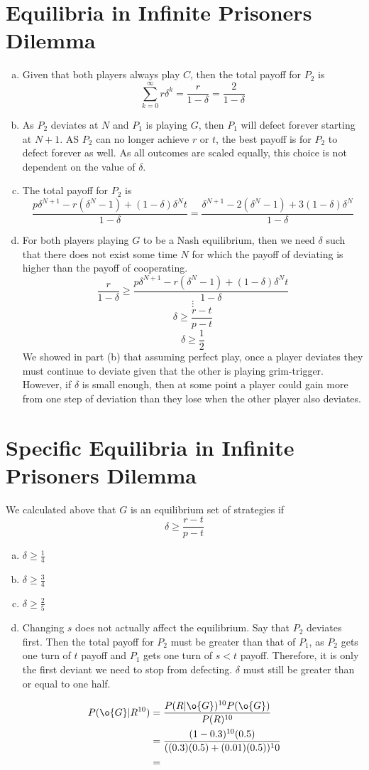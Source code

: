 \documentclass[12pt]{article}
\begin{document}
\section{Equilibria in Infinite Prisoners Dilemma}
\begin{enumerate}[(a)]
\item Given that both players always play $C$, then the total payoff for $P_2$ is
\[\sum_{k = 0}^{\infty} r \delta^k = \frac{r}{1 - \delta} = \frac{2}{1 - \delta}\]
\item As $P_2$ deviates at $N$ and $P_1$ is playing $G$, then $P_1$ will defect forever starting at $N + 1$. AS $P_2$ can no longer achieve $r$ or $t$, the best payoff is for $P_2$ to defect forever as well. As all outcomes are scaled equally, this choice is not dependent on the value of $\delta$.
\item The total payoff for $P_2$ is 
\[\frac{p \delta^{N + 1} -r (\delta^N - 1) + (1-\delta)\delta^N t}{1 - \delta} = \frac{\delta^{N + 1} -2 (\delta^N - 1) + 3(1-\delta)\delta^N}{1 - \delta}\]
\item For both players playing $G$ to be a Nash equilibrium, then we need $\delta$ such that there does not exist some time $N$ for which the payoff of deviating is higher than the payoff of cooperating.
\[\frac{r}{1 - \delta} \geq \frac{p \delta^{N + 1} -r (\delta^N - 1) + (1-\delta)\delta^N t}{1 - \delta}\]
\[\vdots\]
\[\delta \geq \frac{r - t}{p - t}\]
\[\delta \geq \frac{1}{2}\]
We showed in part (b) that assuming perfect play, once a player deviates they must continue to deviate given that the other is playing grim-trigger. However, if $\delta$ is small enough, then at some point a player could gain more from one step of deviation than they lose when the other player also deviates.
\end{enumerate}

\section{Specific Equilibria in Infinite Prisoners Dilemma}
We calculated above that $G$ is an equilibrium set of strategies if 
\[\delta \geq \frac{r - t}{p - t}\]
\begin{enumerate}[(a)]
\item $\delta \geq \frac{1}{4}$
\item $\delta \geq \frac{3}{4}$
\item $\delta \geq \frac{2}{5}$
\item Changing $s$ does not actually affect the equilibrium. Say that $P_2$ deviates first. Then the total payoff for $P_2$ must be greater than that of $P_1$, as $P_2$ gets one turn of $t$ payoff and $P_1$ gets one turn of $s < t$ payoff. Therefore, it is only the first deviant we need to stop from defecting. $\delta$ must still be greater than or equal to one half.
\end{enumerate}

\begin{align*}
 P(\o{G}|R^{10}) &= \frac{P(R|\o{G})^{10}P(\o{G})}{P(R)^{10}} \\
 &= \frac{(1-0.3)^{10}(0.5)}{((0.3)(0.5)+(0.01)(0.5))^10} \\
 &= \\
\end{align*}
\end{document}
